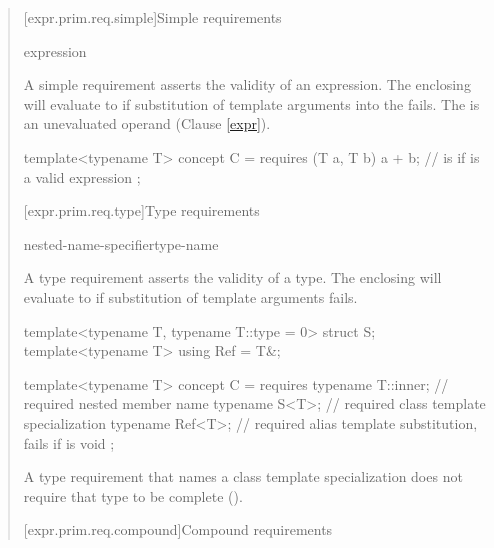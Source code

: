 \begin{quote}
\begin{addedblock}
[expr.prim.req.simple]{Simple requirements}

\begin{bnf}
\br
    expression \terminal{;}
\end{bnf}

\pnum
A simple requirement asserts the validity of an expression.
\enternote
The enclosing  will evaluate to 
if substitution of template arguments into the  fails.
The  is an unevaluated operand (Clause \ref{expr}).
\exitnote

\enterexample
\begin{codeblock}
template<typename T> concept C =
  requires (T a, T b) {
    a + b;  //  is  if  is a valid expression
  };
\end{codeblock}
\exitexample


[expr.prim.req.type]{Type requirements}

\begin{bnf}
\br
     nested-name-specifier\opt type-name \terminal{;}
\end{bnf}

\pnum
A type requirement asserts the validity of a type.
\enternote
The enclosing  will evaluate to 
if substitution of template arguments fails.
\exitnote
\enterexample
\begin{codeblock}
template<typename T, typename T::type = 0> struct S;
template<typename T> using Ref = T&;

template<typename T> concept C =
  requires {
    typename T::inner; // required nested member name
    typename S<T>;     // required class template specialization
    typename Ref<T>;   // required alias template substitution, fails if  is void
  };
\end{codeblock}
\exitexample

\pnum
A type requirement that names a class template specialization 
does not require that type to be complete 
().


[expr.prim.req.compound]{Compound requirements}
      

\end{addedblock}
\end{quote}

